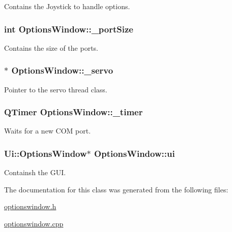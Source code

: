 Contains the Joystick to handle options. 

\hypertarget{a00006_a9bd4dccc7a544b1db78dc8cf330b88f6}{}
\subsubsection[{\+\_\+port\+Size}]{\setlength{\rightskip}{0pt plus 5cm}int Options\+Window\+::\+\_\+port\+Size\hspace{0.3cm}{\ttfamily [private]}}\label{a00006_a9bd4dccc7a544b1db78dc8cf330b88f6}


Contains the size of the ports. 

\hypertarget{a00006_acba1566fea3f831000d5e1c1edc3e776}{}
\subsubsection[{\+\_\+servo}]{$\ast$ Options\+Window\+::\+\_\+servo\hspace{0.3cm}{\ttfamily [private]}}\label{a00006_acba1566fea3f831000d5e1c1edc3e776}


Pointer to the servo thread class. 

\hypertarget{a00006_af6320942b8558140989f552b3bbc1fbd}{}
\subsubsection[{\+\_\+timer}]{\setlength{\rightskip}{0pt plus 5cm}Q\+Timer Options\+Window\+::\+\_\+timer\hspace{0.3cm}{\ttfamily [private]}}\label{a00006_af6320942b8558140989f552b3bbc1fbd}


Waits for a new C\+O\+M port. 

\hypertarget{a00006_a8347442d5b3b670e8fff0c4102db1f88}{}
\subsubsection[{ui}]{\setlength{\rightskip}{0pt plus 5cm}Ui\+::\+Options\+Window$\ast$ Options\+Window\+::ui\hspace{0.3cm}{\ttfamily [private]}}\label{a00006_a8347442d5b3b670e8fff0c4102db1f88}


Containsh the G\+U\+I. 



The documentation for this class was generated from the following files\+:\begin{DoxyCompactItemize}
\item 
\hyperlink{a00019}{optionswindow.\+h}\item 
\hyperlink{a00018}{optionswindow.\+cpp}\end{DoxyCompactItemize}
